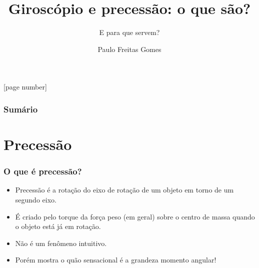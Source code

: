 \documentclass{beamer}
\title{{\Huge Giroscópio e precessão: o que são?}}
\subtitle{{\LARGE E para que servem?}}
\author{{\Large Paulo Freitas Gomes}}%
\begin{document}
[page number] 

\begin{frame}
  \maketitle
\end{frame}

      


\begin{frame}
\frametitle{Sum\'ario} 
\tableofcontents %
\end{frame}

\section{Precessão} 


\begin{frame}
\frametitle{O que é precessão?}
\begin{itemize}
\item Precessão é a rotação do eixo de rotação de um objeto em torno de um segundo eixo.
\item É criado pelo torque da força peso (em geral) sobre o centro de massa quando o objeto está já em rotação. 
\pause
\item Não é um fenômeno intuitivo.
\item Porém mostra o quão sensacional é a grandeza momento angular!
\end{itemize}
\end{frame}
\end{document}
